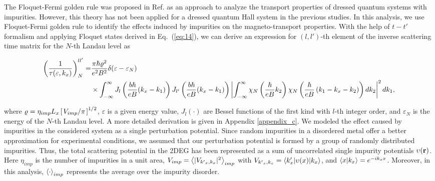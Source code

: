 
The Floquet-Fermi golden rule was proposed in Ref. \cite{wackerl20} as an approach to analyze the transport properties of dressed quantum systems with impurities.
However, this theory has not been applied for a dressed quantum Hall system in the previous studies. In this analysis, we use Floquet-Fermi golden rule to identify the effects induced by impurities on the magneto-transport properties.
With the help of $t-t'$ formalism \cite{wackerl20,grifoni98,sambe75,peskin93,althorpe97} and applying Floquet states derived in Eq.~(\ref{eq:14}), we can derive an  expression for $(l,l')$-th element of the inverse scattering time matrix for the $N$-th Landau level as
\begin{widetext}
\begin{equation} \label{eq:15}
  \begin{aligned}
    \left(\frac{1}{\tau(\varepsilon,k_x)}\right)^{ll'}_N = &
    \frac{ \pi \hbar\varrho^2}{e^2B^2} \delta(\varepsilon - \varepsilon_N) \\
    & \times
    \int_{-\infty}^{\infty}
    J_l \bm{\left(} \frac{b\hbar}{eB}({k}_x - k_1) \bm{\right)}
    J_{l'} \bm{\left(} \frac{b\hbar}{eB}({k}_x - k_1) \bm{\right)}
    \left|
    \int_{-\infty}^{\infty}
    \chi_N \left( \frac{\hbar}{eB}k_2 \right)
    \chi_N \bm{\left(} \frac{\hbar}{eB}
    \left( k_1 - {k}_x - k_2 \right) \bm{\right)}
    dk_2 \right|^2 d k_1,
  \end{aligned}
\end{equation}
\end{widetext}
where $\varrho = \eta_{imp} L_x \left[\flatfrac{ V_{imp}}{\pi}\right]^{1/2}$, $\varepsilon$ is a given energy value, $J_l(\cdot)$ are Bessel functions of the first kind with $l$-th integer order, and $\varepsilon_N$ is the energy of the $N$-th Landau level.
A more detailed derivation is given in Appendix \ref{appendix_c}.
We modeled the effect caused by impurities in the considered system as a single perturbation potential.
Since random impurities in a disordered metal offer a better approximation for experimental conditions, we assumed that our perturbation potential is formed by a group of randomly distributed impurities.
Thus, the total scattering potential in the 2DEG has been represented as a sum of uncorrelated single impurity potentials $\upsilon(\vb{r})$. Here $\eta_{imp}$ is the number of impurities in a unit area, $V_{imp} = \expval{|V_{{k'}_x,k_x}|^2}_{imp}$ with $V_{{k'}_x,k_x} = \mel**{k'_x}{\upsilon(x) }{k_x}$, and $\braket{x}{k_x} = e^{-ik_x x}$.
Moreover, in this analysis, $\expval{\cdot}_{imp}$ represents the average over the impurity disorder.

